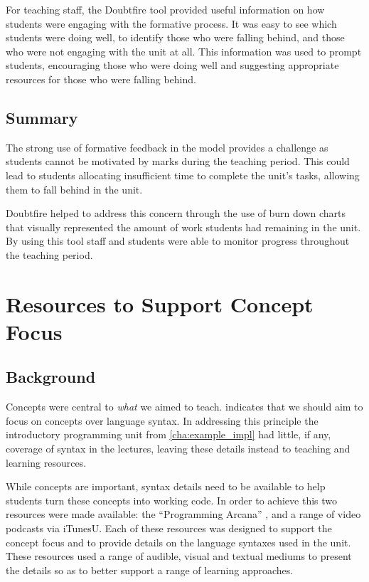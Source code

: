 For teaching staff, the Doubtfire tool provided useful information on how students were engaging with the formative process. It was easy to see which students were doing well, to identify those who were falling behind, and those who were not engaging with the unit at all. This information was used to prompt students, encouraging those who were doing well and suggesting appropriate resources for those who were falling behind.

\subsection{Summary} %
\label{sub:doubtfire_summary}

The strong use of formative feedback in the model provides a challenge as students cannot be motivated by marks during the teaching period. This could lead to students allocating insufficient time to complete the unit's tasks, allowing them to fall behind in the unit.

Doubtfire helped to address this concern through the use of burn down charts that visually represented the amount of work students had remaining in the unit. By using this tool staff and students were able to monitor progress throughout the teaching period.



\section{Resources to Support Concept Focus} %
\label{sec:arcana}

\subsection{Background} %
\label{sub:arcana_background}

Concepts were central to \emph{what} we aimed to teach.  indicates that we should aim to focus on concepts over language syntax. In addressing this principle the introductory programming unit from \cref{cha:example_impl} had little, if any, coverage of syntax in the lectures, leaving these details instead to teaching and learning resources.

While concepts are important, syntax details need to be available to help students turn these concepts into working code. In order to achieve this two resources were made available: the ``Programming Arcana'' \cite{Cain:2013arcana}, and a range of video podcasts via iTunesU. Each of these resources was designed to support the concept focus and to provide details on the language syntaxes used in the unit. These resources used a range of audible, visual and textual mediums to present the details so as to better support a range of learning approaches.

